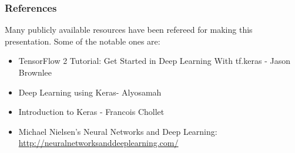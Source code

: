 %
%
%
%



\begin{frame}\frametitle{References}

Many publicly available resources have been refereed for making this presentation. Some of the notable ones are:
\tiny
\begin{itemize}
\item TensorFlow 2 Tutorial: Get Started in Deep Learning With tf.keras - Jason Brownlee
\item Deep Learning using Keras- Alyosamah
\item Introduction to Keras - Francois Chollet
\item Michael Nielsen's Neural Networks and Deep Learning: \url{http://neuralnetworksanddeeplearning.com/}
\end{itemize}


\end{frame}

%
%
%
%
